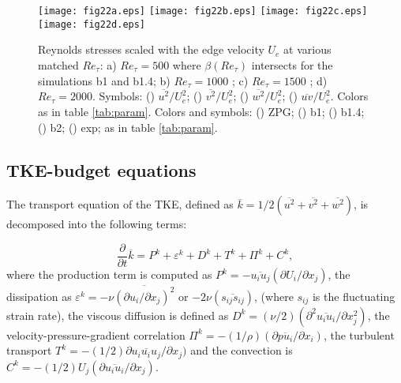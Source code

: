 \begin{figure}
\texttt{[image: fig22a.eps]}
\texttt{[image: fig22b.eps]}
\texttt{[image: fig22c.eps]}
\texttt{[image: fig22d.eps]}
  \caption{ Reynolds stresses scaled with the edge velocity $U_e$ at various matched $Re_{\tau}$: a) $Re_{\tau}=500$ where $\beta(Re_{\tau})$ intersects for the simulations b1 and b1.4; b) $Re_{\tau}=1000$ ; c) $Re_{\tau}=1500$ ; d) $Re_{\tau}=2000$. Symbols: (\protect\blackline) $\overline{u^2}/U_e^2$; (\protect\blackdotted) $\overline{v^2}/U_e^2$; (\protect\blackdash) $\overline{w^2}/U_e^2$; (\protect\blackdashdot) $\overline{uv}/U_e^2$.  Colors as in table \ref{tab:param}. Colors and symbols: (\protect\blackline) ZPG; (\protect\redline) b1; (\protect\orangeline) b1.4; (\protect\greenline) b2; (\protect\redcircle) exp; as in table \ref{tab:param}. }
\label{fig:RSouter}
\end{figure}

\subsection*{  TKE-budget equations}
The transport equation of the TKE, defined as $\overline{k}=1/2( \overline{u^2} + \overline{v^2} + \overline{w^2} ) $, is decomposed into the following terms:

\begin{equation*}
     \frac{\partial }{\partial t} \overline{k} = P^k + \varepsilon^k + D^k + T^k  + \Pi^k + C^k ,
\label{eq:tke_bud}
\end{equation*}
 where the production term is computed as $P^k= - \overline{u_i u_j}({\partial U_i}/{\partial x_j})$, the dissipation as $\varepsilon^{k} = -\nu \overline{ ({\partial u_i}/{\partial x_j})^2}$ or $-2\nu (\overline{s_{ij}s_{ij}})$, (where $s_{ij}$ is the fluctuating strain rate), the viscous diffusion is defined as $D^k=(\nu/2)({\partial^2 \overline{u_iu_i}}/{\partial x^2_j})$, the velocity-pressure-gradient correlation $\Pi^k = -(1/\rho) ({\partial \overline{pu_i}}/{\partial x_i})$, the turbulent transport $T^k=-(1/2){\partial \overline{u_iu_iu_j}}/{\partial x_j})$ and the convection is $C^k=-(1/2)U_j({\partial \overline{u_iu_i}}/{\partial x_j})$. 


